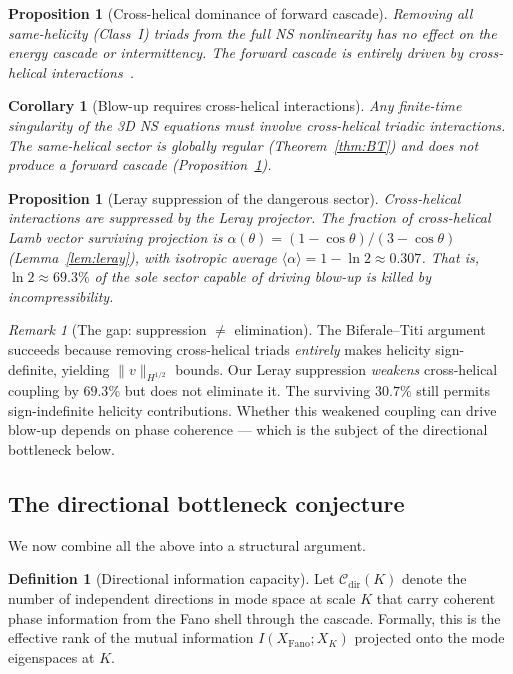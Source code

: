 \documentclass[11pt]{article}
\newtheorem{proposition}[theorem]{Proposition}
\newtheorem{corollary}[theorem]{Corollary}
\theoremstyle{definition}
\newtheorem{definition}[theorem]{Definition}
\theoremstyle{remark}
\newtheorem{remark}[theorem]{Remark}
\begin{document}
\begin{proposition}[Cross-helical dominance of forward cascade]
\label{prop:cross-dominant}
Removing all same-helicity (Class~I) triads from the full NS
nonlinearity has no effect on the energy cascade or intermittency.
The forward cascade is entirely driven by cross-helical
interactions~\cite{SahooBiferale2018}.
\end{proposition}

\begin{corollary}[Blow-up requires cross-helical interactions]
\label{cor:blowup-cross}
Any finite-time singularity of the 3D NS equations must involve
cross-helical triadic interactions. The same-helical sector is globally
regular (Theorem~\ref{thm:BT}) and does not produce a forward cascade
(Proposition~\ref{prop:cross-dominant}).
\end{corollary}

\begin{proposition}[Leray suppression of the dangerous sector]
\label{prop:chain-suppression}
Cross-helical interactions are suppressed by the Leray projector.
The fraction of cross-helical Lamb vector surviving projection is
$\alpha(\theta) = (1-\cos\theta)/(3-\cos\theta)$
(Lemma~\ref{lem:leray}), with isotropic average
$\langle \alpha \rangle = 1 - \ln 2 \approx 0.307$. That is,
$\ln 2 \approx 69.3\%$ of the sole sector capable of driving blow-up
is killed by incompressibility.
\end{proposition}

\begin{remark}[The gap: suppression $\neq$ elimination]
The Biferale--Titi argument succeeds because removing cross-helical
triads \emph{entirely} makes helicity sign-definite, yielding
$\|v\|_{H^{1/2}}$ bounds. Our Leray suppression \emph{weakens}
cross-helical coupling by $69.3\%$ but does not eliminate it. The
surviving $30.7\%$ still permits sign-indefinite helicity contributions.
Whether this weakened coupling can drive blow-up depends on phase
coherence --- which is the subject of the directional bottleneck below.
\end{remark}

\subsection{The directional bottleneck conjecture}

We now combine all the above into a structural argument.

\begin{definition}[Directional information capacity]
Let $\mathcal{C}_{\mathrm{dir}}(K)$ denote the number of independent
directions in mode space at scale $K$ that carry coherent phase
information from the Fano shell through the cascade. Formally, this is
the effective rank of the mutual information
$I(X_{\mathrm{Fano}}; X_K)$ projected onto the mode eigenspaces at $K$.
\end{definition}
\end{document}
